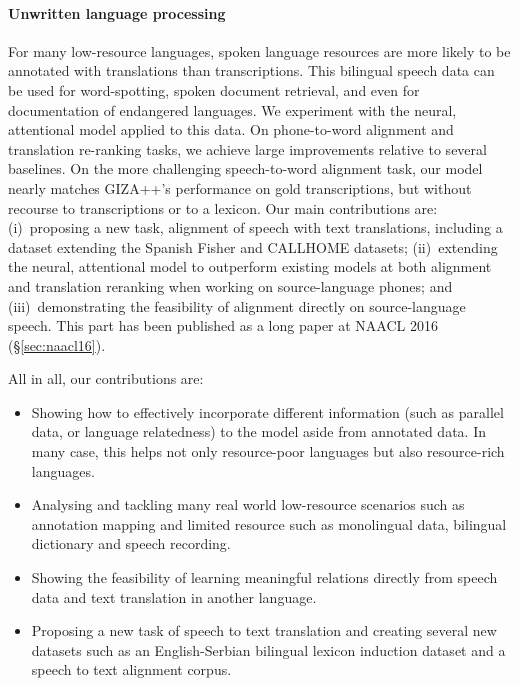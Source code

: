 \documentclass[12pt,twoside,final,hidelinks]{ltthesis}
\theoremstyle{definition}
\newcommand\naaclvi{NAACL 2016 (\S\ref{sec:naacl16})}
\begin{document}
\paragraph{Unwritten language processing} For many low-resource languages, spoken language resources are more likely to be annotated with translations than 
transcriptions. This bilingual speech data can be used for word-spotting, spoken document retrieval, and even for documentation of endangered languages.
We experiment with the neural, attentional model applied to this data. On phone-to-word alignment and translation re-ranking tasks, we achieve large improvements 
relative to several baselines. On the more challenging speech-to-word alignment task, our model nearly matches GIZA++'s performance on gold transcriptions, but without recourse to transcriptions or to a lexicon.
Our main contributions are:
(i)~proposing a new task, alignment of speech with text translations, including a dataset extending the Spanish Fisher and CALLHOME datasets;
(ii)~extending the neural, attentional model to outperform existing models at both alignment and translation reranking when working on source-language phones; and
(iii)~demonstrating the feasibility of alignment directly on source-language speech. 
This part has been published as a long paper at \naaclvi. 

All in all, our contributions are:
\begin{itemize}
\item Showing how to effectively incorporate different information (such as parallel data, or language relatedness) to the model aside from annotated data. In many case, this helps not only resource-poor languages but also resource-rich languages. 
\item Analysing and tackling many real world low-resource scenarios such as annotation mapping and limited resource such as monolingual data, bilingual dictionary and speech recording. 
\item Showing the feasibility of learning meaningful relations directly from speech data and text translation in another language.
\item Proposing a new task of speech to text translation and creating several new datasets such as an English-Serbian bilingual lexicon induction dataset and a speech to text alignment corpus. 
\end{itemize}
\end{document}

